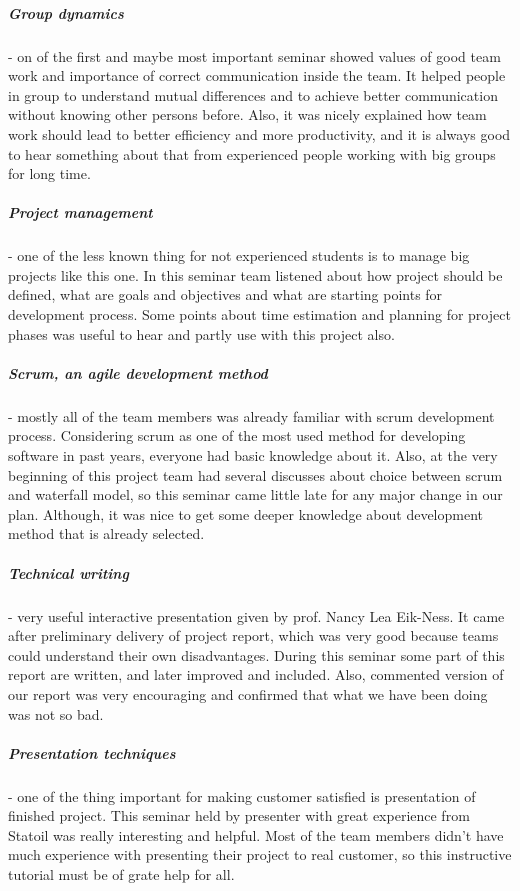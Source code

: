	\subparagraph{Group dynamics} - on of the first and maybe most important seminar showed values of good team work and importance of correct communication inside the team. It helped people in group to understand mutual differences and to achieve better communication without knowing other persons before. Also, it was nicely explained how team work should lead to better efficiency and more productivity, and it is always good to hear something about that from experienced people working with big groups for long time.
	\subparagraph{Project management} - one of the less known thing for not experienced students is to manage big projects like this one. In this seminar team listened about how project should be defined, what are goals and objectives and what are starting points for development process. Some points about time estimation and planning for project phases was useful to hear and partly use with this project also.
	\subparagraph{Scrum, an agile development method} - mostly all of the team members was already familiar with scrum development process. Considering scrum as one of the most used method for developing software in past years, everyone had basic knowledge about it. Also, at the very beginning of this project team had several discusses about choice between scrum and waterfall model, so this seminar came little late for any major change in our plan. Although, it was nice to get some deeper knowledge about development method that is already selected.
	\subparagraph{Technical writing} - very useful interactive presentation given by prof. Nancy Lea Eik-Ness. It came after preliminary delivery of project report, which was very good because teams could understand their own disadvantages. During this seminar some part of this report are written, and later improved and included. Also, commented version of our report was very encouraging and confirmed that what we have been doing was not so bad.
	\subparagraph{Presentation techniques} - one of the thing important for making customer satisfied is presentation of finished project. This seminar held by presenter with great experience from Statoil was really interesting and helpful. Most of the team members didn't have much experience with presenting their project to real customer, so this instructive tutorial must be of grate help for all.


